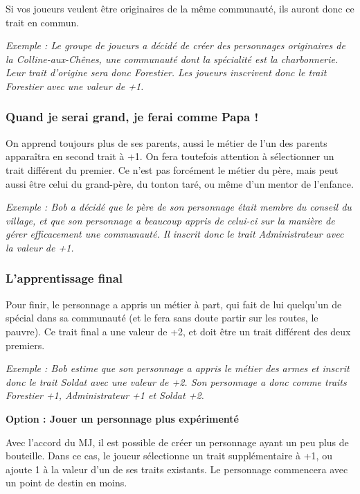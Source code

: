 Si vos joueurs veulent être originaires de la même communauté, ils auront donc ce trait en commun.

\emph{Exemple : Le groupe de joueurs a décidé de créer des personnages originaires de la Colline-aux-Chênes, une communauté dont la spécialité est la charbonnerie. Leur trait d'origine sera donc Forestier. Les joueurs inscrivent donc le trait Forestier avec une valeur de +1.}

\subsubsection*{Quand je serai grand, je ferai comme Papa !}

On apprend toujours plus de ses parents, aussi le métier de l'un des parents apparaîtra en second trait à +1. On fera toutefois attention à sélectionner un trait différent du premier. Ce n'est pas forcément le métier du père, mais peut aussi être celui du grand-père, du tonton taré, ou même d'un mentor de l'enfance.

\emph{Exemple : Bob a décidé que le père de son personnage était membre du conseil du village, et que son personnage a beaucoup appris de celui-ci sur la manière de gérer efficacement une communauté. Il inscrit donc le trait Administrateur avec la valeur de +1.}

\subsubsection*{L'apprentissage final}

Pour finir, le personnage a appris un métier à part, qui fait de lui quelqu'un de spécial dans sa communauté (et le fera sans doute partir sur les routes, le pauvre). Ce trait final a une valeur de +2, et doit être un trait différent des deux premiers.

\emph{Exemple : Bob estime que son personnage a appris le métier des armes et inscrit donc le trait Soldat avec une valeur de +2. Son personnage a donc comme traits Forestier +1, Administrateur +1 et Soldat +2.}

\begin{mdframed}
\textbf{Option : Jouer un personnage plus expérimenté}

Avec l'accord du MJ, il est possible de créer un personnage ayant un peu plus de bouteille. Dans ce cas, le joueur sélectionne un trait supplémentaire à +1, ou ajoute 1 à la valeur d'un de ses traits existants. Le personnage commencera avec un point de destin en moins.
\end{mdframed}

